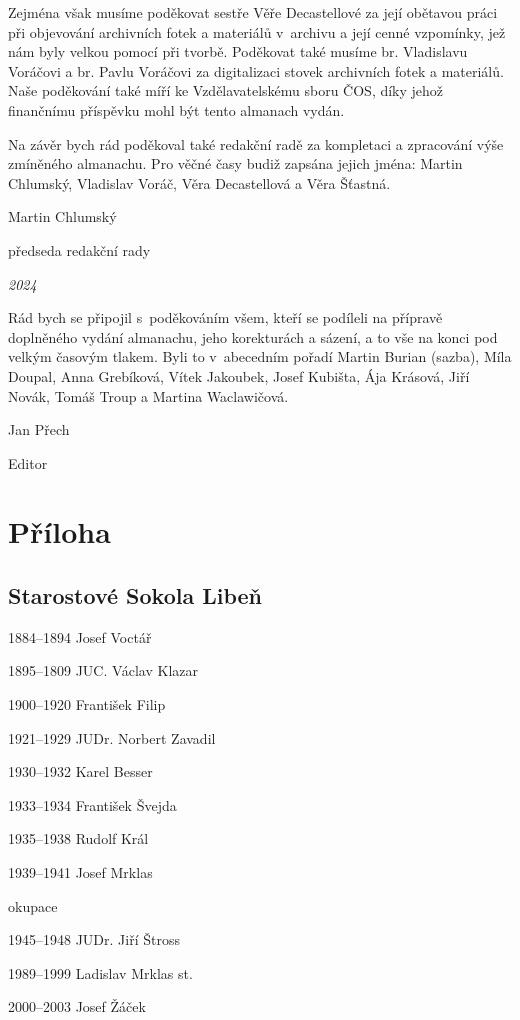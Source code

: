 \documentclass[a5paper, 11pt, twoside]{article}
\begin{document}
Zejména však musíme poděkovat sestře Věře Decastellové za její obětavou
práci při objevování archivních fotek a materiálů v~archivu a její cenné
vzpomínky, jež nám byly velkou pomocí při tvorbě. Poděkovat také musíme
br. Vladislavu Voráčovi a br. Pavlu Voráčovi za digitalizaci stovek
archivních fotek a materiálů. Naše poděkování také míří ke
Vzdělavatelskému sboru ČOS, díky jehož finančnímu příspěvku mohl být
tento almanach vydán.

Na závěr bych rád poděkoval také redakční radě za kompletaci a
zpracování výše zmíněného almanachu. Pro věčné časy budiž zapsána jejich
jména: Martin Chlumský, Vladislav Voráč, Věra Decastellová a Věra
Šťastná.

Martin Chlumský

předseda redakční rady

\textit{2024}

Rád bych se připojil s~poděkováním všem, kteří se podíleli na přípravě
doplněného vydání almanachu, jeho korekturách a sázení, a to vše na
konci pod velkým časovým tlakem. Byli to v~abecedním pořadí Martin
Burian (sazba), Míla Doupal, Anna Grebíková, Vítek Jakoubek, Josef
Kubišta, Ája Krásová, Jiří Novák, Tomáš Troup a Martina Waclawičová.

Jan Přech

Editor

\section{Příloha}

\subsection{Starostové Sokola Libeň }

1884--1894 Josef Voctář

1895--1809 JUC. Václav Klazar

1900--1920 František Filip

1921--1929 JUDr. Norbert Zavadil

1930--1932 Karel Besser

1933--1934 František Švejda

1935--1938 Rudolf Král

1939--1941 Josef Mrklas

okupace

1945--1948 JUDr. Jiří Štross

1989--1999 Ladislav Mrklas st.

2000--2003 Josef Žáček
\end{document}
